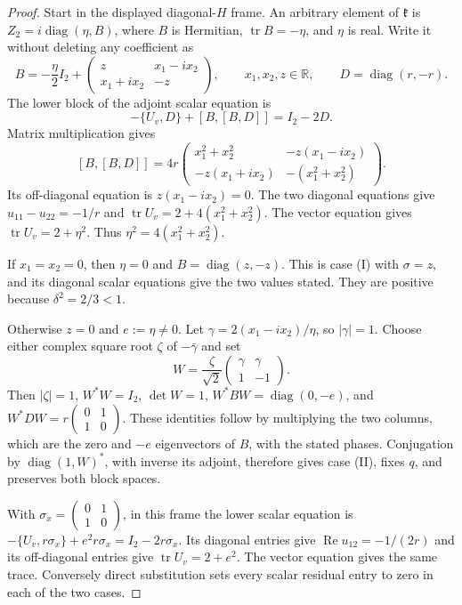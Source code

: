 \begin{proof}
Start in the displayed diagonal-$H$ frame. An arbitrary element of
$\mathfrak k$ is $Z_2=i\operatorname{diag}(\eta,B)$, where $B$ is
Hermitian, $\operatorname{tr} B=-\eta$, and $\eta$ is real. Write it without deleting
any coefficient as
\[
 B=-\frac\eta2I_2+
 \begin{pmatrix}z&x_1-i x_2\\x_1+i x_2&-z\end{pmatrix},
 \qquad x_1,x_2,z\in\mathbb R,
 \qquad D=\operatorname{diag}(r,-r).
\]
The lower block of the adjoint scalar equation is
\[
 -\{U_v,D\}+[B,[B,D]]=I_2-2D.
\]
Matrix multiplication gives
\[
 [B,[B,D]]=4r
 \begin{pmatrix}
 x_1^2+x_2^2&-z(x_1-i x_2)\\
 -z(x_1+i x_2)&-(x_1^2+x_2^2)
 \end{pmatrix}.
\]
Its off-diagonal equation is $z(x_1-i x_2)=0$.
The two diagonal equations give
$u_{11}-u_{22}=-1/r$ and
$\operatorname{tr} U_v=2+4(x_1^2+x_2^2)$.
The vector equation gives $\operatorname{tr} U_v=2+\eta^2$.
Thus $\eta^2=4(x_1^2+x_2^2)$.

If $x_1=x_2=0$, then $\eta=0$ and $B=\operatorname{diag}(z,-z)$.
This is case (I) with $\sigma=z$, and its diagonal scalar equations
give the two values stated. They are positive because $\delta^2=2/3<1$.

Otherwise $z=0$ and $e:=\eta\ne0$.
Let $\gamma=2(x_1-i x_2)/\eta$, so $|\gamma|=1$.
Choose either complex square root $\zeta$ of $-\bar\gamma$ and set
\[
 W=\frac\zeta{\sqrt2}\begin{pmatrix}\gamma&\gamma\\1&-1\end{pmatrix}.
\]
Then $|\zeta|=1$, $W^*W=I_2$, $\det W=1$,
$W^*BW=\operatorname{diag}(0,-e)$, and $W^*DW=r\left(
\begin{smallmatrix}0&1\\1&0\end{smallmatrix}\right)$.
These identities follow by multiplying the two columns, which are the
zero and $-e$ eigenvectors of $B$, with the stated phases.
Conjugation by $\operatorname{diag}(1,W)^*$, with inverse its adjoint,
therefore gives case (II), fixes $q$, and preserves both block spaces.

With $\sigma_x=\left(\begin{smallmatrix}0&1\\1&0\end{smallmatrix}\right)$,
in this frame the lower scalar equation is
$-\{U_v,r\sigma_x\}+e^2r\sigma_x=I_2-2r\sigma_x$.
Its diagonal entries give $\operatorname{Re}u_{12}=-1/(2r)$ and
its off-diagonal entries give $\operatorname{tr} U_v=2+e^2$.
The vector equation gives the same trace. Conversely direct substitution
sets every scalar residual entry to zero in each of the two cases.
\end{proof}

